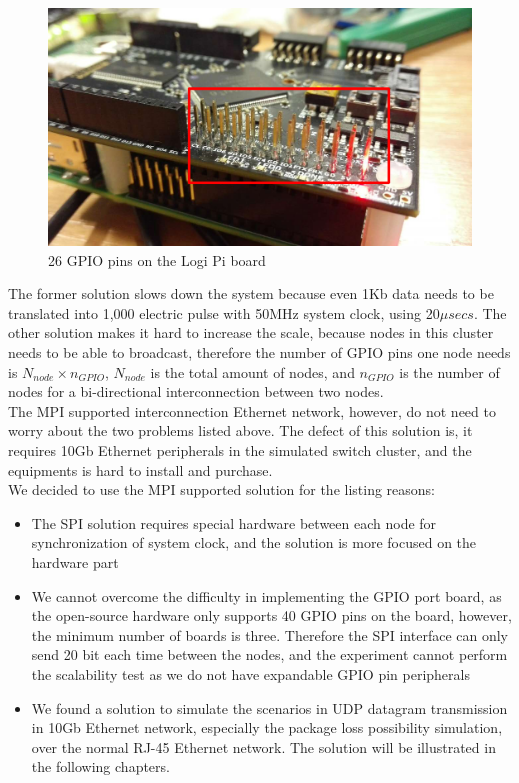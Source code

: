 \documentclass[11pt,openright,a4paper]{report}
\begin{document}
\begin{figure}[H]
	\centering
	\includegraphics[width=0.7\linewidth]{picture/photo/GPIOpin}
	\caption{26 GPIO pins on the Logi Pi board}
	\label{fig:GPIOpin}
\end{figure}
The former solution slows down the system because even 1Kb data needs to be translated into 1,000 electric pulse with 50MHz system clock, using 20$\mu secs$. The other solution makes it hard to increase the scale, because nodes in this cluster needs to be able to broadcast, therefore the number of GPIO pins one node needs is $N_{node}\times n_{GPIO}$, $N_{node}$ is the total amount of nodes, and $n_{GPIO}$ is the number of nodes for a bi-directional interconnection between two nodes.\\ 
The MPI supported interconnection Ethernet network, however, do not need to worry about the two problems listed above. The defect of this solution is, it requires 10Gb Ethernet peripherals in the simulated switch cluster, and the equipments is hard to install and purchase.\\
We decided to use the MPI supported solution for the listing reasons:
\begin{itemize}
	\item The SPI solution requires special hardware between each node for synchronization of system clock, and the solution is more focused on the hardware part
	\item We cannot overcome the difficulty in implementing the GPIO port board, as the open-source hardware only supports 40 GPIO pins on the board, however, the minimum number of boards is three. Therefore the SPI interface can only send 20 bit each time between the nodes, and the experiment cannot perform the scalability test as we do not have expandable GPIO pin peripherals
	\item We found a solution to simulate the scenarios in UDP datagram transmission in 10Gb Ethernet network, especially the package loss possibility simulation, over the normal RJ-45 Ethernet network. The solution will be illustrated in the following chapters.
\end{itemize}
\end{document}
